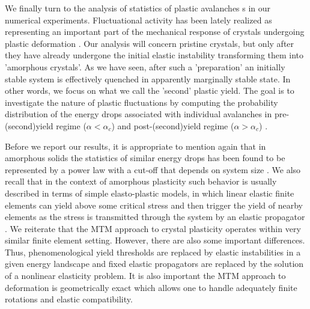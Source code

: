 \documentclass[aps,
superscriptaddress,notitlepage]{revtex4-1}
\begin{document}
We finally turn to the analysis of statistics of plastic avalanches s in our numerical experiments. Fluctuational activity  has  been lately realized as representing an important part of the mechanical  response of crystals undergoing plastic deformation \cite{Papanikolaou2017-ld,Weiss2015-eh,Zaiser2006-gk,Tarp2014-ro,Miguel2006-wd,Alava2014,Sethna2017}. Our analysis will concern   pristine crystals, but only after they have already undergone the  initial elastic instability transforming them into 'amorphous crystals'.  As we have seen,  after such a 'preparation' an initially   stable system is  effectively quenched in  apparently marginally stable  state.  In other words, we focus on what we call the 'second'  plastic yield.  The goal is to investigate the nature of plastic fluctuations by computing  the probability distribution of the energy drops associated with individual  avalanches in  pre-(second)yield regime ($\alpha<\alpha_c$) and post-(second)yield regime  ($\alpha>\alpha_c$) .  





Before we report our results,  it is appropriate to mention again that in amorphous solids the statistics of similar energy drops has been found to be represented by a power law with a cut-off that depends on system size \cite{Tyukodi2016-dv,Budrikis2017-ex,Lerner2018-ue,Ozawa2022-xb}.  We also recall that in the context of amorphous plasticity such  behavior is usually  described in terms of simple elasto-plastic models, in which   linear elastic finite elements  can yield above some critical stress and then  trigger the yield of nearby elements as   the stress is transmitted  through the system by an elastic propagator \cite{Nicolas2018-iy,PhysRevLett.129.228002,Ferrero2019-rx,Fernandez-Castellanos2021-yn}. We reiterate that  the MTM  approach to crystal plasticity operates within  very similar finite element setting. However, there are also some important differences. Thus, phenomenological  yield thresholds are replaced by elastic instabilities in a given energy landscape and  fixed elastic propagators are replaced by the solution of a nonlinear elasticity problem. It is also important  the MTM approach to deformation is geometrically exact which allows one to  handle adequately finite rotations and elastic compatibility.
\end{document}
